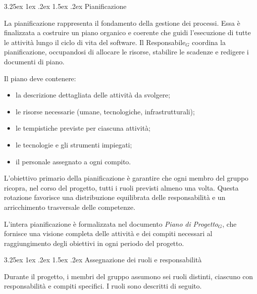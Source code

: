 \documentclass[a4paper, 10pt]{article}
\makeatletter
\renewcommand\paragraph{\@startsection{paragraph}{4}{\z@}%
  {3.25ex \@plus1ex \@minus .2ex}%
  {1.5ex \@plus .2ex}%
  {\normalfont\normalsize\bfseries}}
\makeatother
\begin{document}
\paragraph{Pianificazione}

La pianificazione rappresenta il fondamento della gestione dei processi. Essa è finalizzata a costruire un piano organico e coerente che guidi l'esecuzione di tutte le attività lungo il ciclo di vita del software. Il Responsabile$_G$ coordina la pianificazione, occupandosi di allocare le risorse, stabilire le scadenze e redigere i documenti di piano.

Il piano deve contenere:
\begin{itemize}
    \item la descrizione dettagliata delle attività da svolgere;
    \item le risorse necessarie (umane, tecnologiche, infrastrutturali);
    \item le tempistiche previste per ciascuna attività;
    \item le tecnologie e gli strumenti impiegati;
    \item il personale assegnato a ogni compito.
\end{itemize}

L'obiettivo primario della pianificazione è garantire che ogni membro del gruppo ricopra, nel corso del progetto, tutti i ruoli previsti almeno una volta. Questa rotazione favorisce una distribuzione equilibrata delle responsabilità e un arricchimento trasversale delle competenze.

L'intera pianificazione è formalizzata nel documento \emph{Piano di Progetto}$_G$, che fornisce una visione completa delle attività e dei compiti necessari al raggiungimento degli obiettivi in ogni periodo del progetto.

\paragraph{Assegnazione dei ruoli e responsabilità}

Durante il progetto, i membri del gruppo assumono sei ruoli distinti, ciascuno con responsabilità e compiti specifici. I ruoli sono descritti di seguito.
\end{document}
